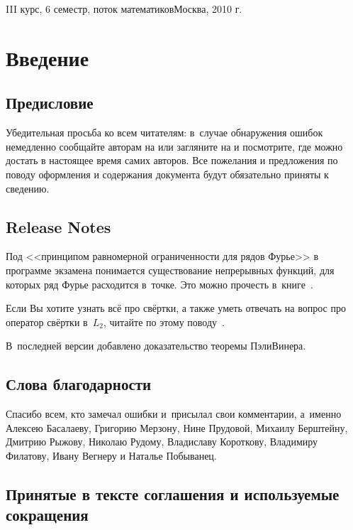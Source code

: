 \documentclass[a4paper]{article}
\begin{document}
{III курс, 6 семестр, поток математиков}{Москва, 2010 г.} \pagebreak

\pagestyle{plain}
\tableofcontents
\pagebreak

\section*{Введение}

\subsection*{Предисловие}

Убедительная просьба ко всем читателям: в~случае обнаружения ошибок
немедленно сообщайте авторам на \dmvnmail{} или загляните на \dmvnwebsite{} и посмотрите, где можно
достать в настоящее время самих авторов. Все пожелания и предложения по поводу оформления
и содержания документа будут обязательно приняты к сведению.

\subsection*{Release Notes}

Под <<принципом равномерной ограниченности для рядов Фурье>> в программе экзамена
понимается существование непрерывных функций, для которых ряд Фурье расходится в~точке.
Это можно прочесть в~книге~\hbox{\cite[гл.VIII,~\S1, п.\,1]{kf}}.

Если Вы хотите узнать всё про свёртки, а также уметь отвечать на вопрос про оператор свёртки в~$L_2$,
читайте по этому поводу~\cite[гл.\,III,~\S9]{bogachev}.

В~последней версии добавлено доказательство теоремы Пэли\ч Винера.

\subsection*{Слова благодарности}

Спасибо всем, кто замечал ошибки и~присылал свои комментарии, а~именно Алексею Басалаеву, Григорию Мерзону,
Нине Прудовой, Михаилу Берштейну, Дмитрию Рыжову, Николаю Рудому, Владиславу Короткову, Владимиру Филатову, Ивану
Вегнеру и Наталье Побыванец.


\subsection*{Принятые в тексте соглашения и используемые сокращения}
\end{document}
